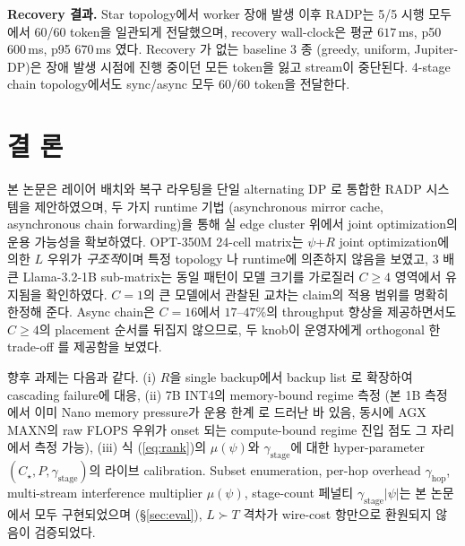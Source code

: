 \documentclass[10pt,twocolumn,a4paper]{article}
\newcommand{\sys}{RADP}
\begin{document}
\textbf{Recovery 결과.} Star topology에서 worker 장애 발생 이후
\sys{}는 5/5 시행 모두에서 60/60 token을 일관되게 전달했으며,
recovery wall-clock은 평균 $617$\,ms, p50 $600$\,ms,
p95 $670$\,ms 였다. Recovery
가 없는 baseline 3 종 (greedy, uniform, Jupiter-DP)은 장애 발생
시점에 진행 중이던 모든 token을 잃고 stream이 중단된다. 4-stage
chain topology에서도 sync/async 모두 60/60 token을 전달한다.

\FloatBarrier

\section{결  론}

본 논문은 레이어 배치와 복구 라우팅을 단일 alternating DP
로 통합한 \sys{} 시스템을 제안하였으며, 두 가지 runtime 기법
(asynchronous mirror cache, asynchronous chain forwarding)을 통해
실 edge cluster 위에서 joint optimization의 운용 가능성을 확보하였다.
OPT-350M 24-cell matrix는 $\psi$+$R$ joint optimization에 의한
$L$ 우위가 \emph{구조적}이며 특정 topology 나 runtime에 의존하지
않음을 보였고, 3 배 큰 Llama-3.2-1B sub-matrix는 동일 패턴이
모델 크기를 가로질러 $C\!\geq\!4$ 영역에서 유지됨을 확인하였다.
$C\!=\!1$의 큰 모델에서 관찰된 교차는 claim의 적용 범위를
명확히 한정해 준다. Async chain은 $C\!=\!16$에서 $17$--$47\%$의
throughput 향상을 제공하면서도 $C\!\geq\!4$의 placement 순서를
뒤집지 않으므로, 두 knob이 운영자에게 orthogonal 한 trade-off
를 제공함을 보였다.

향후 과제는 다음과 같다. (i) $R$을 single backup에서 backup list
로 확장하여 cascading failure에 대응, (ii) 7B INT4의 memory-bound
regime 측정 (본 1B 측정에서 이미 Nano memory pressure가 운용 한계
로 드러난 바 있음, 동시에 AGX MAXN의 raw FLOPS 우위가 onset 되는
compute-bound regime 진입 점도 그 자리에서 측정 가능), (iii) 식
(\ref{eq:rank})의 $\mu(\psi)$와 $\gamma_{\mathrm{stage}}$에 대한
hyper-parameter $(C_\star, P, \gamma_{\mathrm{stage}})$의 라이브
calibration.
Subset enumeration, per-hop overhead $\gamma_{\mathrm{hop}}$,
multi-stream interference multiplier $\mu(\psi)$, stage-count
페널티 $\gamma_{\mathrm{stage}}|\psi|$는 본 논문에서 모두
구현되었으며 (\S\ref{sec:eval}), $L\!\succ\!T$ 격차가 wire-cost
항만으로 환원되지 않음이 검증되었다.



\end{document}

